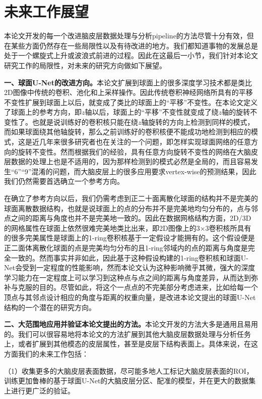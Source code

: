 \section{未来工作展望}
本论文开发的每一个改进脑皮层数据处理与分析pipeline的方法尽管十分有效，但在某些方面仍然存在一些局限性以及有待改进的地方。我们都知道事物的发展总是处于一个螺旋式上升或波浪式前进的过程。因此在这最后一小节，我们针对本论文研究工作的局限性，对未来的研究方向做如下展望。

\textbf{一、球面U-Net的改进方向。}本论文扩展到球面上的很多深度学习技术都是类比2D图像中传统的卷积、池化和上采样操作。因此传统卷积神经网络所具有的平移不变性扩展到球面上以后，就变成了类比的球面上的“平移”不变性。在本论文定义了球面上的参考方向，即$z$轴以后，球面上的“平移”不变性就变成了绕$z$轴的旋转不变性了。也就是说训练好的卷积核只能在绕$z$轴旋转的方向上检测到同样的模式，而如果球面绕其他轴旋转，那么之前训练好的卷积核便不能成功地检测到相应的模式，这是近几年来很多研究者也在关注的一个问题\cite{esteves2018learning,cohen2018spherical,cohen2019gauge}，即怎样实现球面网络的任意方向的旋转不变性。然而根据我们的经验，具有任意方向旋转不变性的网络在大脑皮层数据的处理上也是不适用的，因为那样检测到的模式必然是全局的，而且容易发生“6”“9”混淆的问题，而大脑皮层上的很多应用要求vertex-wise的预测结果，因此我们仍然需要首选确立一个参考方向。

在确立了参考方向以后，我们仍需考虑到正二十面离散化球面的结构并不是完美的球面离散数据结构，也就是说球面上的点的分布并不是完美地均匀分布的，点与邻点之间的距离与角度也并不是完美地一致的。因此在数据网格结构方面，2D/3D的网格属性在球面上依然很难完美地类比出来，即2D图像上的3$\times$3卷积核所具有的很多完美属性是球面上的1-ring卷积核基于一定假设才能拥有的。这个假设便是正二面体离散化球面的点是完美均匀分布的且1-ring邻域内的点的距离与角度是完全一致的。然而事实并非如此，因此基于这种假设构建的1-ring卷积核和球面U-Net会受到一定程度的性能影响，然而本论文认为这种影响微乎其微，强大的深度学习能力在一定程度上可以学习到这种点与点之间的距离与角度差异，从而达到弥补与克服的目的。尽管如此，将这个一点点的不完美部分考虑进来，比如给每一个顶点与其邻点设计相应的角度与距离的权重向量，是改进本论文提出的球面U-Net结构的一个潜在的研究方向。

\textbf{二、大范围地应用并验证本论文提出的方法。}本论文开发的方法大多是通用且易用的。我们可以很容易地将本论文的方法扩展到其他大脑皮层数据处理与分析任务上，或者扩展到其他模态的皮层属性，甚至是皮层下结构表面上。具体来说，在这方面我们的未来工作包括：

（1）收集更多的大脑皮层表面数据，尽可能多地人工标记大脑皮层表面的ROI，训练更加鲁棒的基于球面U-Net的大脑皮层分区、配准的模型，并在更大的数据集上进行更广泛的验证。

